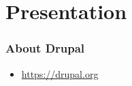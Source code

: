 \section{Presentation}

\begin{frame}[allowframebreaks]
\frametitle{About Drupal}

\begin{itemize}
	\item \url{https://drupal.org}
\end{itemize}

\end{frame}